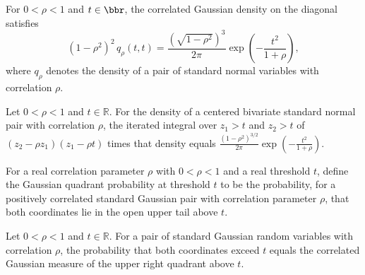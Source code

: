 \begin{theorem}
\label{FABL.variance_sq_mul_correlatedGaussianDensity_diagonal}
\leanok
{}
For $0<\rho<1$ and $t\in\bbr$, the correlated Gaussian density on the diagonal satisfies
\[(1-\rho^2)^2\,q_\rho(t,t)=\frac{(\sqrt{1-\rho^2})^3}{2\pi}\exp\!\left(-\frac{t^2}{1+\rho}\right),\]
where $q_\rho$ denotes the density of a pair of standard normal variables with
correlation $\rho$.
\end{theorem}

\begin{theorem}
\label{FABL.gaussian_weighted_quadrant_integral}
\leanok
{}
Let $0<\rho<1$ and $t\in\mathbb R$. For the density of a centered bivariate standard
normal pair with correlation $\rho$, the iterated integral over $z_1>t$ and $z_2>t$ of
$(z_2-\rho z_1)(z_1-\rho t)$ times that density equals
$\frac{(1-\rho^2)^{3/2}}{2\pi}\exp\!\left(-\frac{t^2}{1+\rho}\right)$.
\end{theorem}

\begin{definition}
\label{FABL.gaussianQuadrantAtThreshold}
\leanok
{}
For a real correlation parameter $\rho$ with $0<\rho<1$ and a real threshold $t$, define
the Gaussian quadrant probability at threshold $t$ to be the probability, for a
positively correlated standard Gaussian pair with correlation parameter $\rho$, that
both coordinates lie in the open upper tail above $t$.
\end{definition}

\begin{theorem}
\label{FABL.gaussianQuadrantAtThreshold_eq_measure}
\leanok
{}
Let $0<\rho<1$ and $t\in\mathbb R$. For a pair of standard Gaussian random variables
with correlation $\rho$, the probability that both coordinates exceed $t$ equals the
correlated Gaussian measure of the upper right quadrant above $t$.
\end{theorem}

